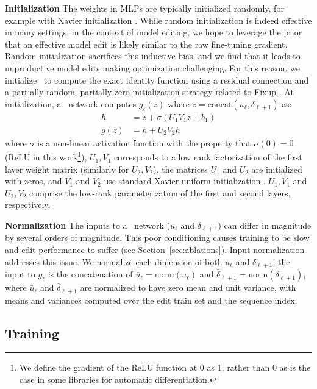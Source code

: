 \documentclass{article}
\begin{document}
\textbf{Initialization} The weights in MLPs are typically initialized randomly, for example with Xavier initialization \citep{pmlr-v9-glorot10a}. While random initialization is indeed effective in many settings, in the context of model editing, we hope to leverage the prior that an effective model edit is likely similar to the raw fine-tuning gradient. Random initialization sacrifices this inductive bias, and we find that it leads to unproductive model edits making optimization challenging. For this reason, we initialize \name~to compute the exact identity function using a residual connection \citep{he2016deep} and a partially random, partially zero-initialization strategy related to Fixup \citep{zhang2018residual}. At initialization, a \name~network computes $g_\ell(z)$ where $z=\text{concat}(u_\ell, \delta_{\ell+1})$ as:
\begin{align}
    h &= z + \sigma(U_1V_1 z + b_1) \\
    g(z) &= h + U_2V_2 h
\end{align}
where $\sigma$ is a non-linear activation function with the property that $\sigma(0) = 0$ (ReLU in this work\footnote{We define the gradient of the ReLU function at 0 as 1, rather than 0 as is the case in some libraries for automatic differentiation.}), $U_1,V_1$ corresponds to a low rank factorization of the first layer weight matrix (similarly for $U_2,V_2$), the matrices $U_1$ and $U_2$ are initialized with zeros, and $V_1$ and $V_2$ use standard Xavier uniform initialization \citep{pmlr-v9-glorot10a}. $U_1,V_1$ and $U_2,V_2$ comprise the low-rank parameterization of the first and second layers, respectively.

\textbf{Normalization} The inputs to a \name~network ($u_\ell$ and $\delta_{\ell+1}$) can differ in magnitude by several orders of magnitude. This poor conditioning causes training to be slow and edit performance to suffer (see Section~\ref{sec:ablations}). Input normalization addresses this issue. We normalize each dimension of both $u_\ell$ and $\delta_{\ell+1}$; the input to $g_\ell$ is the concatenation of $\bar{u}_\ell=\text{norm}(u_\ell)$ and $\bar{\delta}_{\ell+1} = \text{norm}(\delta_{\ell+1})$, where $\bar{u}_\ell$ and $\bar{\delta}_{\ell+1}$ are normalized to have zero mean and unit variance, with means and variances computed over the edit train set and the sequence index.

\subsection{Training \name}
\end{document}
